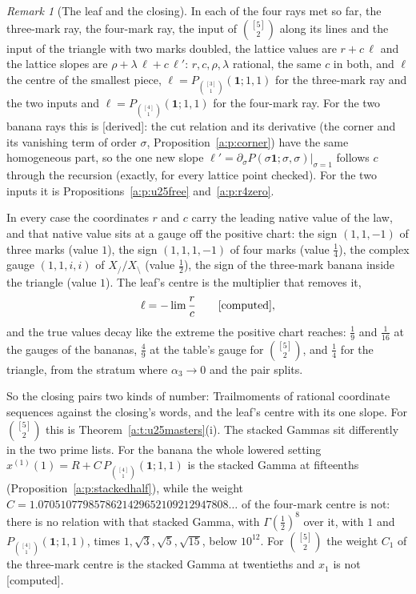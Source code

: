 \documentclass[11pt]{article}
\newcommand{\one}{\mathbf 1}
\newcommand{\Pth}{P_{\binom{[3]}1}(\one;1,1)}
\newcommand{\Pfour}{P_{\binom{[4]}1}(\one;1,1)}
\theoremstyle{plain}
\theoremstyle{definition}
\theoremstyle{remark}
\newtheorem{remark}[proposition]{Remark}
\newcommand{\derived}{\textup{[derived]}}
\newcommand{\computed}{\textup{[computed]}}
\begin{document}
\begin{remark}[The leaf and the closing]\label{a:r:leaf}
In each of the four rays met so far, the three-mark ray, the four-mark ray, the input of $\binom{[5]}2$ along its lines and the input of the triangle with two marks doubled, the lattice values are $r+c\,\ell$ and the lattice slopes are $\rho+\lambda\,\ell+c\,\ell'$: $r,c,\rho,\lambda$ rational, the same $c$ in both, and $\ell$ the centre of the smallest piece, $\ell=\Pth$ for the three-mark ray and the two inputs and $\ell=\Pfour$ for the four-mark ray. For the two banana rays this is \derived: the cut relation and its derivative (the corner and its vanishing term of order $\sigma$, Proposition~\ref{a:p:corner}) have the same homogeneous part, so the one new slope $\ell'=\partial_\sigma P(\sigma\one;\sigma,\sigma)|_{\sigma=1}$ follows $c$ through the recursion (exactly, for every lattice point checked). For the two inputs it is Propositions~\ref{a:p:u25free} and~\ref{a:p:r4zero}.

In every case the coordinates $r$ and $c$ carry the leading native value of the law, and that native value sits at a gauge off the positive chart: the sign $(1,1,-1)$ of three marks (value $1$), the sign $(1,1,1,-1)$ of four marks (value $\frac14$), the complex gauge $(1,1,i,i)$ of $X_{/}/X_{\setminus}$ (value $\frac12$), the sign of the three-mark banana inside the triangle (value $1$). The leaf's centre is the multiplier that removes it,
\[
\ell=-\lim\frac rc\qquad\computed,
\]
and the true values decay like the extreme the positive chart reaches: $\frac19$ and $\frac1{16}$ at the gauges of the bananas, $\frac49$ at the table's gauge for $\binom{[5]}2$, and $\frac14$ for the triangle, from the stratum where $\alpha_3\to0$ and the pair splits.

So the closing pairs two kinds of number: Trailmoments of rational coordinate sequences against the closing's words, and the leaf's centre with its one slope. For $\binom{[5]}2$ this is Theorem~\ref{a:t:u25masters}(i). The stacked Gammas sit differently in the two prime lists. For the banana the whole lowered setting $x^{(1)}(1)=R+C\,\Pfour$ is the stacked Gamma at fifteenths (Proposition~\ref{a:p:stackedhalf}), while the weight $C=1.0705107798578621429652109212947808\ldots$ of the four-mark centre is not: there is no relation with that stacked Gamma, with $\Gamma(\frac12)^8$ over it, with $1$ and $\Pfour$, times $1,\sqrt3,\sqrt5,\sqrt{15}$, below $10^{12}$. For $\binom{[5]}2$ the weight $C_1$ of the three-mark centre is the stacked Gamma at twentieths and $x_1$ is not \computed.
\end{remark}
\end{document}
